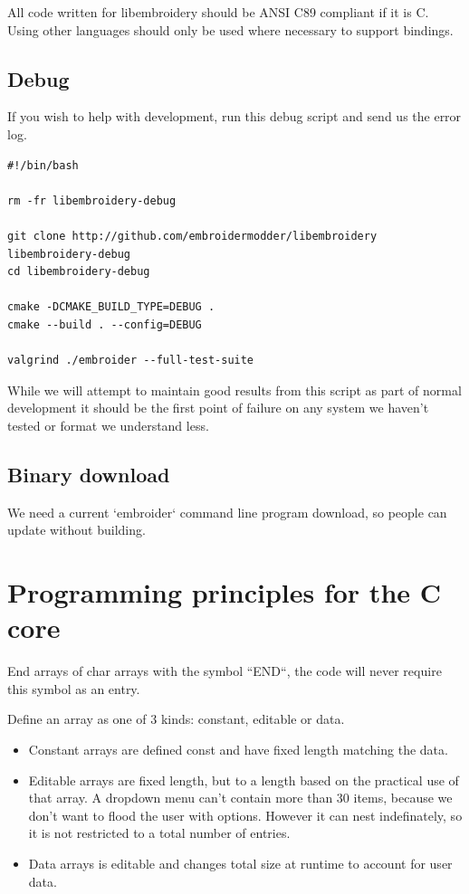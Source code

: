 \documentclass[11pt]{report}
\begin{document}
All code written for libembroidery should be ANSI C89 compliant
if it is C. Using other languages should only be used where
necessary to support bindings.

\subsection{Debug}

If you wish to help with development, run this debug script and send us the
error log.

\begin{lstlisting}
#!/bin/bash

rm -fr libembroidery-debug

git clone http://github.com/embroidermodder/libembroidery libembroidery-debug
cd libembroidery-debug

cmake -DCMAKE_BUILD_TYPE=DEBUG .
cmake --build . --config=DEBUG

valgrind ./embroider --full-test-suite
\end{lstlisting}

While we will attempt to maintain good results from this script as part of
normal development it should be the first point of failure on any system we
haven't tested or format we understand less.

\subsection{Binary download}

We need a current `embroider` command line program download, so people can update
without building.

\section{Programming principles for the C core}

End arrays of char arrays with the symbol ``END``, the code will never require
this symbol as an entry.

Define an array as one of 3 kinds: constant, editable or data.

\begin{itemize}
\item Constant arrays are defined const and have fixed length matching the data.
\item Editable arrays are fixed length, but to a length based on the practical use
  of that array. A dropdown menu can't contain more than 30 items, because we
  don't want to flood the user with options. However it can nest indefinately,
  so it is not restricted to a total number of entries.
\item Data arrays is editable and changes total size at runtime to account for user data.
\end{itemize}
\end{document}
